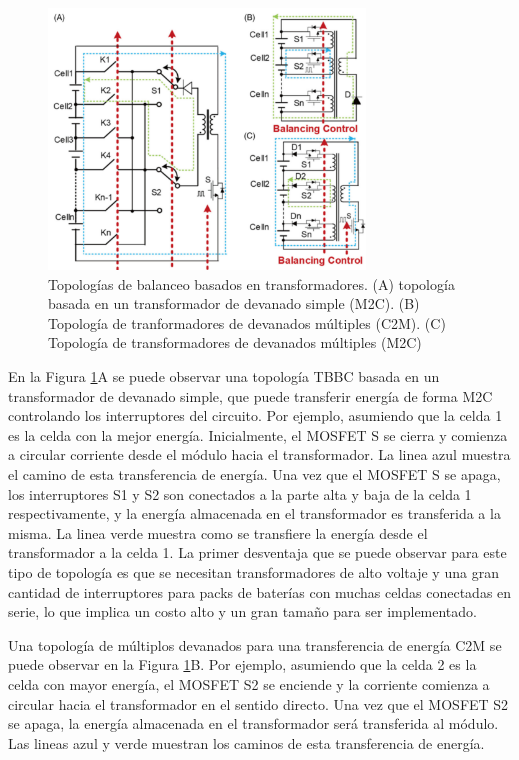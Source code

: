 \documentclass[10pt,a4paper]{article}
\begin{document}
\begin{figure}[h!]
    \begin{center}
        \includegraphics[width=0.75\textwidth]{tbbc_top.png}
        \caption{Topolog\'ias de balanceo basados en transformadores. (A)
        topolog\'ia basada en un transformador de devanado simple
        (\acrshort{M2C}). (B) Topolog\'ia de tranformadores de devanados
        m\'ultiples (\acrshort{C2M}). (C) Topolog\'ia de transformadores de
        devanados m\'ultiples (\acrshort{M2C})}
        \label{tbbc_top}
    \end{center}
\end{figure}

En la Figura \ref{tbbc_top}A se puede observar una topolog\'ia \acrshort{TBBC}
basada en un transformador de devanado simple, que puede transferir energ\'ia de
forma \acrshort{M2C} controlando los interruptores del circuito. Por ejemplo,
asumiendo que la celda 1 es la celda con la mejor energ\'ia. Inicialmente, el
MOSFET S se cierra y comienza a circular corriente desde el m\'odulo hacia el
transformador. La linea azul muestra el camino de esta transferencia de
energ\'ia. Una vez que el MOSFET S se apaga, los interruptores S1 y S2 son
conectados a la parte alta y baja de la celda 1 respectivamente, y la energ\'ia
almacenada en el transformador es transferida a la misma. La linea verde muestra
como se transfiere la energ\'ia desde el transformador a la celda 1. La primer
desventaja que se puede observar para este tipo de topolog\'ia es que se
necesitan transformadores de alto voltaje y una gran cantidad de interruptores
para packs de bater\'ias con muchas celdas conectadas en serie, lo que implica
un costo alto y un gran tamaño para ser implementado.

Una topolog\'ia de m\'ultiplos devanados para una transferencia de energ\'ia
\acrshort{C2M} se puede observar en la Figura \ref{tbbc_top}B. Por ejemplo,
asumiendo que la celda 2 es la celda con mayor energ\'ia, el MOSFET S2 se
enciende y la corriente comienza a circular hacia el transformador en el sentido
directo. Una vez que el MOSFET S2 se apaga, la energ\'ia almacenada en el
transformador ser\'a transferida al m\'odulo. Las lineas azul y verde muestran
los caminos de esta transferencia de energ\'ia.
\end{document}
